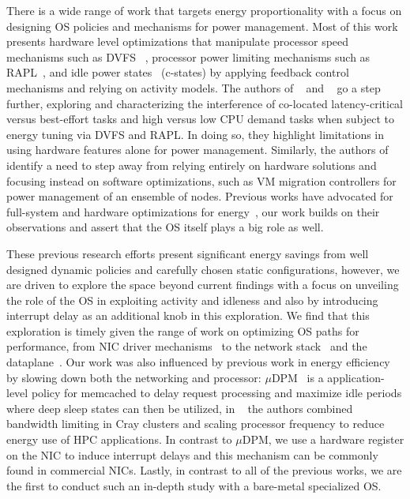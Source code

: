 There is a wide range of work that targets energy proportionality with a focus on designing OS policies and mechanisms for power management. Most of this work presents hardware level optimizations that manipulate processor speed mechanisms such as DVFS ~\cite{10.5555/2523721.2523732,10.1145/381677.381702,cpufreq_governor,4273098,packandcap,10.1109/MICRO.2006.8,1598114,10.1145/1629911.1629926,4658633,4343825,10.1109/IGCC.2011.6008552,10.1145/1241601.1241609, slowdownorsleep,4228267, mootaz}, processor power limiting mechanisms such as RAPL~\cite{intel_rapl, heracles, SmoothOperator,oldi-pegasus, Dynamo,PerAppPower,powercap}, and idle power states~\cite{cpuidle_policy,peafowl, udpm,6983037,dreamweaver, pacingtoidle} (c-states) by applying feedback control mechanisms and relying on activity models. The authors of ~\cite{heracles} and ~\cite{PerAppPower} go a step further, exploring and characterizing the interference of co-located latency-critical versus best-effort tasks and high versus low CPU demand tasks when subject to energy tuning via DVFS and RAPL. In doing so, they highlight limitations in using hardware features alone for power management. Similarly, the authors of ~\cite{hotpower2008, 7349225} identify a need to step away from relying entirely on hardware solutions and focusing instead on software optimizations, such as VM migration controllers for power management of an ensemble of nodes. Previous works have advocated for full-system and hardware optimizations for energy~\cite{slowdownorsleep,powernap}, our work builds on their observations and assert that the OS itself plays a big role as well. 

These previous research efforts present significant energy savings from well designed dynamic policies and carefully chosen static configurations, however, we are driven to explore the space beyond current findings with a focus on unveiling the role of the OS in exploiting activity and idleness and also by introducing interrupt delay as an additional knob in this exploration. We find that this exploration is timely given the range of work on optimizing OS paths for performance, from NIC driver mechanisms~\cite{flexnic, affinityaccept, network-latency} to the network stack~\cite{mtcp, sandstorm, network-latency} and the dataplane~\cite{222583, arrakis, EbbRT, shenango, zygos, ix}. Our work was also influenced by previous work in energy efficiency by slowing down both the networking and processor: $\mu$DPM~\cite{udpm} is a application-level policy for memcached to delay request processing and maximize idle periods where deep sleep states can then be utilized, in ~\cite{10.5555/2338816.2338822} the authors combined bandwidth limiting in Cray clusters and scaling processor frequency to reduce energy use of HPC applications. In contrast to $\mu$DPM, we use a hardware register on the NIC to induce interrupt delays and this mechanism can be commonly found in commercial NICs. Lastly, in contrast to all of the previous works, we are the first to conduct such an in-depth study with a bare-metal specialized OS.

